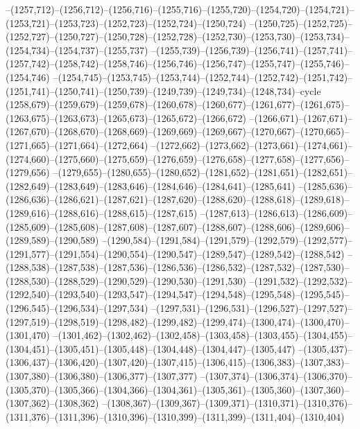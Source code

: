 --(1257,712)--(1256,712)--(1256,716)--(1255,716)--(1255,720)--(1254,720)--(1254,721)--(1253,721)--(1253,723)--(1252,723)--(1252,724)--(1250,724)
--(1250,725)--(1252,725)--(1252,727)--(1250,727)--(1250,728)--(1252,728)--(1252,730)--(1253,730)--(1253,734)--(1254,734)--(1254,737)--(1255,737)
--(1255,739)--(1256,739)--(1256,741)--(1257,741)--(1257,742)--(1258,742)--(1258,746)--(1256,746)--(1256,747)--(1255,747)--(1255,746)--(1254,746)
--(1254,745)--(1253,745)--(1253,744)--(1252,744)--(1252,742)--(1251,742)--(1251,741)--(1250,741)--(1250,739)--(1249,739)--(1249,734)--(1248,734)--cycle
(1258,679)--(1259,679)--(1259,678)--(1260,678)--(1260,677)--(1261,677)--(1261,675)--(1263,675)--(1263,673)--(1265,673)--(1265,672)--(1266,672)
--(1266,671)--(1267,671)--(1267,670)--(1268,670)--(1268,669)--(1269,669)--(1269,667)--(1270,667)--(1270,665)--(1271,665)--(1271,664)--(1272,664)
--(1272,662)--(1273,662)--(1273,661)--(1274,661)--(1274,660)--(1275,660)--(1275,659)--(1276,659)--(1276,658)--(1277,658)--(1277,656)--(1279,656)
--(1279,655)--(1280,655)--(1280,652)--(1281,652)--(1281,651)--(1282,651)--(1282,649)--(1283,649)--(1283,646)--(1284,646)--(1284,641)--(1285,641)
--(1285,636)--(1286,636)--(1286,621)--(1287,621)--(1287,620)--(1288,620)--(1288,618)--(1289,618)--(1289,616)--(1288,616)--(1288,615)--(1287,615)
--(1287,613)--(1286,613)--(1286,609)--(1285,609)--(1285,608)--(1287,608)--(1287,607)--(1288,607)--(1288,606)--(1289,606)--(1289,589)--(1290,589)
--(1290,584)--(1291,584)--(1291,579)--(1292,579)--(1292,577)--(1291,577)--(1291,554)--(1290,554)--(1290,547)--(1289,547)--(1289,542)--(1288,542)
--(1288,538)--(1287,538)--(1287,536)--(1286,536)--(1286,532)--(1287,532)--(1287,530)--(1288,530)--(1288,529)--(1290,529)--(1290,530)--(1291,530)
--(1291,532)--(1292,532)--(1292,540)--(1293,540)--(1293,547)--(1294,547)--(1294,548)--(1295,548)--(1295,545)--(1296,545)--(1296,534)--(1297,534)
--(1297,531)--(1296,531)--(1296,527)--(1297,527)--(1297,519)--(1298,519)--(1298,482)--(1299,482)--(1299,474)--(1300,474)--(1300,470)--(1301,470)
--(1301,462)--(1302,462)--(1302,458)--(1303,458)--(1303,455)--(1304,455)--(1304,451)--(1305,451)--(1305,448)--(1304,448)--(1304,447)--(1305,447)
--(1305,437)--(1306,437)--(1306,420)--(1307,420)--(1307,415)--(1306,415)--(1306,383)--(1307,383)--(1307,380)--(1306,380)--(1306,377)--(1307,377)
--(1307,374)--(1306,374)--(1306,370)--(1305,370)--(1305,366)--(1304,366)--(1304,361)--(1305,361)--(1305,360)--(1307,360)--(1307,362)--(1308,362)
--(1308,367)--(1309,367)--(1309,371)--(1310,371)--(1310,376)--(1311,376)--(1311,396)--(1310,396)--(1310,399)--(1311,399)--(1311,404)--(1310,404)
